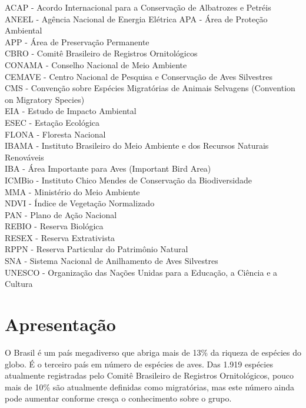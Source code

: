\documentclass[
]{scrbook}
\begin{document}
ACAP - Acordo Internacional para a Conservação de Albatrozes e Petréis\\
ANEEL - Agência Nacional de Energia Elétrica
APA - Área de Proteção Ambiental\\
APP - Área de Preservação Permanente\\
CBRO - Comitê Brasileiro de Registros Ornitológicos\\
CONAMA - Conselho Nacional de Meio Ambiente\\
CEMAVE - Centro Nacional de Pesquisa e Conservação de Aves Silvestres\\
CMS - Convenção sobre Espécies Migratórias de Animais Selvagens (Convention on Migratory Species)\\
EIA - Estudo de Impacto Ambiental\\
ESEC - Estação Ecológica\\
FLONA - Floresta Nacional\\
IBAMA - Instituto Brasileiro do Meio Ambiente e dos Recursos Naturais Renováveis\\
IBA - Área Importante para Aves (Important Bird Area)\\
ICMBio - Instituto Chico Mendes de Conservação da Biodiversidade\\
MMA - Ministério do Meio Ambiente\\
NDVI - Índice de Vegetação Normalizado\\
PAN - Plano de Ação Nacional\\
REBIO - Reserva Biológica\\
RESEX - Reserva Extrativista\\
RPPN - Reserva Particular do Patrimônio Natural\\
SNA - Sistema Nacional de Anilhamento de Aves Silvestres\\
UNESCO - Organização das Nações Unidas para a Educação, a Ciência e a Cultura

\hypertarget{apresentacao}{%
\chapter*{Apresentação}\label{apresentacao}}

O Brasil é um país megadiverso que abriga mais de 13\% da riqueza de espécies do globo. É o terceiro país em número de espécies de aves. Das 1.919 espécies atualmente registradas pelo Comitê Brasileiro de Registros Ornitológicos, pouco mais de 10\% são atualmente definidas como migratórias, mas este número ainda pode aumentar conforme cresça o conhecimento sobre o grupo.
\end{document}

